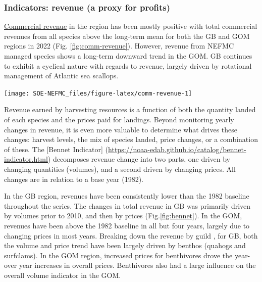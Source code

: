 \documentclass[
  10pt,
]{article}
\let\origfigure\figure
\let\endorigfigure\endfigure
\renewenvironment{figure}[1][2] {
    \expandafter\origfigure\expandafter[H]
} {
    \endorigfigure
}
\begin{document}
\hypertarget{indicators-revenue-a-proxy-for-profits}{%
\subsubsection{Indicators: revenue (a proxy for profits)}\label{indicators-revenue-a-proxy-for-profits}}

\href{https://noaa-edab.github.io/catalog/commercial-landings-and-revenue.html}{Commercial revenue} in the region has been mostly positive with total commercial revenues from all species above the long-term mean for both the GB and GOM regions in 2022 (Fig. \ref{fig:comm-revenue}). However, revenue from NEFMC managed species shows a long-term downward trend in the GOM. GB continues to exhibit a cyclical nature with regards to revenue, largely driven by rotational management of Atlantic sea scallops.

\begin{figure}

{\centering \texttt{[image: SOE-NEFMC\_files/figure-latex/comm-revenue-1]} 

}

\caption{Revenue through 2022 for the New England region: total (black) and from NEFMC managed species (red).}\label{fig:comm-revenue}
\end{figure}

Revenue earned by harvesting resources is a function of both the quantity landed of each species and the prices paid for landings. Beyond monitoring yearly changes in revenue, it is even more valuable to determine what drives these changes: harvest levels, the mix of species landed, price changes, or a combination of these. The {[}Bennet Indicator{]} (\url{https://noaa-edab.github.io/catalog/bennet-indicator.html}) decomposes revenue change into two parts, one driven by changing quantities (volumes), and a second driven by changing prices. All changes are in relation to a base year (1982).

In the GB region, revenues have been consistently lower than the 1982 baseline throughout the series. The changes in total revenue in GB was primarily driven by volumes prior to 2010, and then by prices (Fig.\ref{fig:bennet}). In the GOM, revenues have been above the 1982 baseline in all but four years, largely due to changing prices in most years. Breaking down the revenue by guild , for GB, both the volume and price trend have been largely driven by benthos (quahogs and surfclams). In the GOM region, increased prices for benthivores drove the year-over year increases in overall prices. Benthivores also had a large influence on the overall volume indicator in the GOM.
\end{document}
